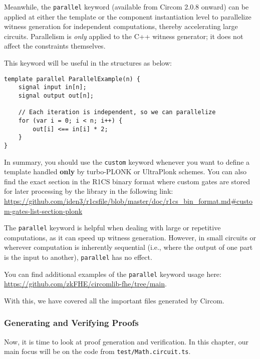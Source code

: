 \documentclass[../lecture-notes.tex]{subfiles}
\begin{document}
    Meanwhile, the \texttt{parallel} keyword (available from Circom 2.0.8 onward) can be applied at either the template or
    the component instantiation level to parallelize witness generation for independent computations, thereby accelerating large circuits.
    Parallelism is \emph{only} applied to the C++ witness generator; it does not affect the constraints themselves.

    This keyword will be useful in the structures as below:

    \begin{lstlisting}[language=Circom,basicstyle=\ttfamily\footnotesize]
template parallel ParallelExample(n) {
    signal input in[n];
    signal output out[n];

    // Each iteration is independent, so we can parallelize
    for (var i = 0; i < n; i++) {
        out[i] <== in[i] * 2;
    }
}
    \end{lstlisting}

    In summary, you should use the \texttt{custom} keyword whenever you want to define a template handled \textbf{only} by turbo-PLONK or UltraPlonk schemes.
    You can also find the exact section in the R1CS binary format where custom gates are stored for later processing by the library in the following link: \\
    \url{https://github.com/iden3/r1csfile/blob/master/doc/r1cs_bin_format.md\#custom-gates-list-section-plonk}

    The \texttt{parallel} keyword is helpful when dealing with large or repetitive computations, as it can speed up witness generation.
    However, in small circuits or wherever computation is inherently sequential (i.e., where the output of one part is the input to another), \texttt{parallel} has no effect.

    You can find additional examples of the \texttt{parallel} keyword usage here: \url{https://github.com/zkFHE/circomlib-fhe/tree/main}.

    With this, we have covered all the important files generated by Circom.

    \subsubsection{Generating and Verifying Proofs}

    Now, it is time to look at proof generation and verification.
    In this chapter, our main focus will be on the code from \texttt{test/Math.circuit.ts}.
\end{document}
